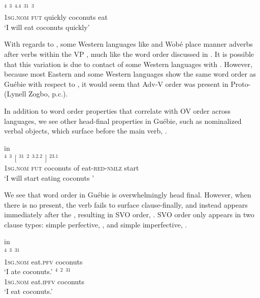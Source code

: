 \documentclass[output=paper]{LSP/langsci}
\begin{document}
\\
\gll {}$^{4}$ $^{3}$ \textbf{$^{4.4}$} $^{31}$ \textbf{$^{3}$} \\
\textsc{1sg}.\textsc{nom} \textsc{fut} quickly  coconuts eat \\
\glt `I will eat coconuts quickly' \label{advv}
\z
\z

With regards to , some Western  languages like  and Wob\'e place manner adverbs after verbs within the VP \citep[80-81]{Marchese1979}, much like the  word order discussed in . It is possible that this variation is due to contact of some Western  languages with . However, because most Eastern and some Western  languages show the same word order as Gu\'ebie with respect to , it would seem that Adv-V order was present in Proto- (Lynell Zogbo, p.c.).

In addition to word order properties that correlate with OV order across languages, we see other head-final properties in Gu\'ebie, such as nominalized verbal objects, which surface before the main verb, .

 in \\ \label{ex:5:Guebie}
\gll {}$^{4}$ $^{3}$ [ $^{31}$ $^{2}$ $^{3.2.2}$ ] $^{23.1}$ \\
\textsc{1sg}.\textsc{nom} \textsc{fut} {} coconuts of eat-\textsc{red}-\textsc{nmlz} {} start \\
\glt `I will start eating coconuts '
\z

We see that word order in Gu\'ebie is overwhelmingly head final. However, when there is no  present, the verb fails to surface clause-finally, and instead appears immediately after the , resulting in SVO order, . SVO order only appears in two clause types: simple perfective, ,  and simple imperfective, .

 in \\ \label{ex:6:Guebie}
\ea 
\gll {}$^{4}$ \textbf{$^{3}$}  $^{31}$ \\
\textsc{1sg}.\textsc{nom} eat.\textsc{pfv} coconuts \\
\glt `I ate coconuts.' \label{ex:6a:Guebie}
\ex 
\gll {}$^{4}$ \textbf{$^{2}$}  $^{31}$ \\
\textsc{1sg}.\textsc{nom} eat.\textsc{ipfv} coconuts \\
\glt `I eat coconuts.' \label{ex:6b:Guebie}
\z
\z
\end{document}
